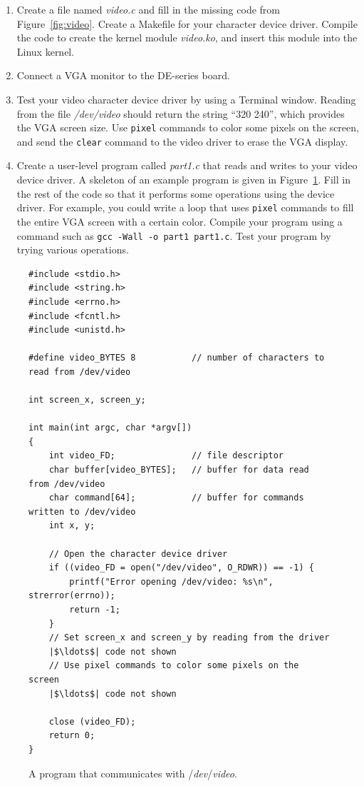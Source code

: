 \documentclass[epsfig,10pt,fullpage]{article}
\begin{document}
\begin{enumerate}
\item Create a file named {\it video.c} and fill in the missing code from Figure~\ref{fig:video}.
Create a Makefile for your character device driver. Compile the code to create the 
kernel module {\it video.ko}, and insert this module into the Linux kernel. 
\item Connect a VGA monitor to the DE-series board.
\item Test your video character device driver by using a Terminal window. Reading from the file
{\it /dev/video} should return the string ``320 240'', which provides the VGA screen size.
Use \texttt{pixel} commands to color some pixels on the screen, and send the 
\texttt{clear} command to the video driver to erase the VGA display.
\item
Create a user-level program called {\it part1.c} that reads and writes to your video device
driver. A skeleton of an example program is given in Figure~\ref{fig:part1}. Fill in the rest 
of the code so that it performs some operations using the device driver. For example, you could 
write a loop that uses \texttt{pixel} commands to fill the entire VGA screen with a certain color.
Compile your program using a command such as \texttt{gcc -Wall -o part1 part1.c}.
Test your program by trying various operations. 
\end{enumerate}

\lstset{language=C,numbers=none}
\begin{figure}[H]
\begin{center}
\begin{minipage}[t]{15 cm}
\begin{lstlisting}[name=part1]
#include <stdio.h>
#include <string.h>
#include <errno.h>
#include <fcntl.h>
#include <unistd.h>

#define video_BYTES 8			// number of characters to read from /dev/video

int screen_x, screen_y;

int main(int argc, char *argv[])
{
    int video_FD;				// file descriptor
    char buffer[video_BYTES];	// buffer for data read from /dev/video
    char command[64];			// buffer for commands written to /dev/video
    int x, y;
    
    // Open the character device driver
    if ((video_FD = open("/dev/video", O_RDWR)) == -1) {
        printf("Error opening /dev/video: %s\n", strerror(errno));
        return -1;
    }
    // Set screen_x and screen_y by reading from the driver
    |$\ldots$| code not shown
    // Use pixel commands to color some pixels on the screen
    |$\ldots$| code not shown

    close (video_FD);
    return 0;
}
\end{lstlisting}
\end{minipage}
\vspace{-0.5cm}
\caption{A program that communicates with /{\it dev}/{\it video}.}
\label{fig:part1}
\end{center}
\end{figure}
\end{document}
